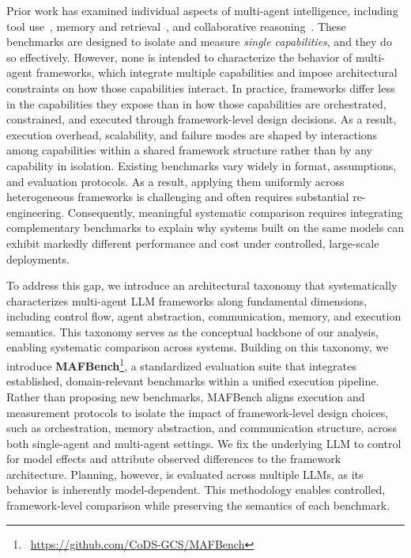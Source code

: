 Prior work has examined individual aspects of multi-agent intelligence, including tool use~\cite{mialon2023gaiabenchmarkgeneralai, nguyen2024dynasaur, guo2024stabletoolbench, shi2025retrievalmodelsarenttoolsavvy}, memory and retrieval~\cite{hu2025memoryagentbench, hsieh2024ruler, li2018towards, xu2024detectiveqa, zhong2023mquake}, and collaborative reasoning~\cite{coordinationcollaborativereasoning}. These benchmarks are designed to isolate and measure \emph{single capabilities}, and they do so effectively. However, none is intended to characterize the behavior of multi-agent frameworks, which integrate multiple capabilities and impose architectural constraints on how those capabilities interact. In practice, frameworks differ less in the capabilities they expose than in how those capabilities are orchestrated, constrained, and executed through framework-level design decisions. As a result, execution overhead, scalability, and failure modes are shaped by interactions among capabilities within a shared framework structure rather than by any capability in isolation. 
Existing benchmarks vary widely in format, assumptions, and evaluation protocols. As a result, applying them uniformly across heterogeneous frameworks is challenging and often requires substantial re-engineering.
Consequently, meaningful systematic comparison requires integrating complementary benchmarks to explain why systems built on the same models can exhibit markedly different performance and cost under controlled, large-scale deployments.


To address this gap, we introduce an architectural taxonomy that systematically characterizes multi-agent LLM frameworks along fundamental dimensions, including control flow, agent abstraction, communication, memory, and execution semantics. This taxonomy serves as the conceptual backbone of our analysis, enabling systematic comparison across systems. Building on this taxonomy, we introduce \textbf{MAFBench}\footnote{\vspace{-2mm}\faGithub\ \href{https://github.com/CoDS-GCS/MAFBench}{https://github.com/CoDS-GCS/MAFBench}}, a standardized evaluation suite that integrates established, domain-relevant benchmarks within a unified execution pipeline. Rather than proposing new benchmarks, MAFBench aligns execution and measurement protocols to isolate the impact of framework-level design choices, such as orchestration, memory abstraction, and communication structure, across both single-agent and multi-agent settings. 
We fix the underlying LLM to control for model effects and attribute observed differences to the framework architecture. Planning, however, is evaluated across multiple LLMs, as its behavior is inherently model-dependent. This methodology enables controlled, framework-level comparison while preserving the semantics of each benchmark.


